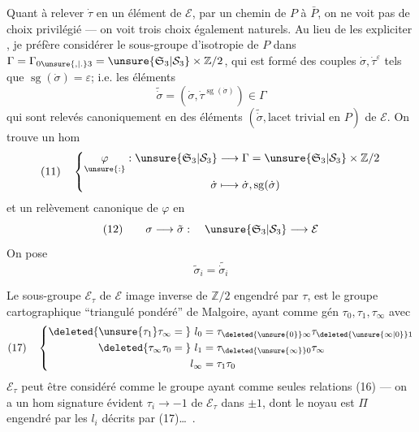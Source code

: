 Quant à relever $\dot\tau$ en un élément de $\mathcal E$, par un chemin de $P$ à $\bar P$, on ne voit pas de choix privilégié --- on voit trois choix également naturels. Au lieu de les expliciter , je préfère considérer le sous-groupe d'isotropie de $P$ dans $\Gamma=\Gamma_{0\unsure{,|.}3}=\unsure{\mathfrak S_3|\mathcal S_3}\times\mathbb Z/2$, qui est formé des couples $\dot\sigma,\dot\tau^\varepsilon$ tels que $\operatorname{sg}(\dot\sigma)=\varepsilon$;  i.e. les éléments
\[
\widetilde{\dot\sigma}=(\dot\sigma,\dot\tau^{\operatorname{sg}(\dot\sigma)})\in\Gamma
\]
qui sont relevés canoniquement en des éléments $(\widetilde{\dot\sigma},\text{lacet trivial en }P)$ de $\mathcal E$. On trouve un hom
\[
(11)\quad\left\{\begin{aligned}
\underset{\unsure{:}}{\varphi}:\unsure{\mathfrak S_3|\mathcal S_3}&\longrightarrow\Gamma=\unsure{\mathfrak S_3|\mathcal S_3}\times\mathbb Z/2\\
\dot\sigma&\longmapsto\dot\sigma,\operatorname{sg}(\dot\sigma)
\end{aligned}\right.
\]
et un relèvement canonique de $\varphi$ en
\[
(12)\qquad\sigma\longrightarrow\tilde\sigma:\quad\unsure{\mathfrak S_3|\mathcal S_3}\longrightarrow\mathcal E
\]
On pose
\[
\tilde\sigma_i=\widetilde{\dot\sigma_i}
\]

Le sous-groupe $\mathcal E_\tau$ de $\mathcal E$ image inverse de $\mathbb Z/2$ engendré par $\tau$, est le groupe cartographique ``triangulé pondéré'' de Malgoire, ayant comme gén $\tau_0,\tau_1,\tau_\infty$  avec
\[
(17)\quad\left\{\begin{aligned}
\deleted{\unsure{\tau_1}\tau_\infty={}}\ l_0&=\tau_{\deleted{\unsure{0}}\infty}\tau_{\deleted{\unsure{\infty|0}}1}\\
\deleted{\tau_\infty\tau_0={}}\ l_1&=\tau_{\deleted{\unsure{\infty}}0}\tau_\infty\\
l_\infty&=\tau_1\tau_0
\end{aligned}\right.
\]
$\mathcal E_\tau$ peut être considéré comme le groupe ayant comme  seules relations (16) --- on a un hom signature évident $\tau_i\longrightarrow-1$ de $\mathcal E_\tau$ dans $\pm1$, dont le noyau est $\Pi$ engendré par les $l_i$ décrits par (17)\ldots\ .

